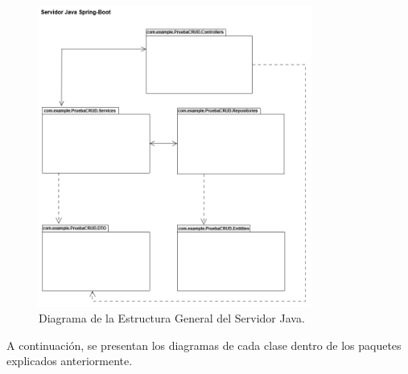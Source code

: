 \begin{figure}[htbp!]
	\begin{center}
		\includegraphics[width=0.8\textwidth]{Clases/DCG.png}
		\caption{Diagrama de la Estructura General del Servidor Java.}
		\label{fig:DCG}
	\end{center}
\end{figure}

A continuación, se presentan los diagramas de cada clase dentro de los paquetes explicados anteriormente.

\newpage

\newpage
